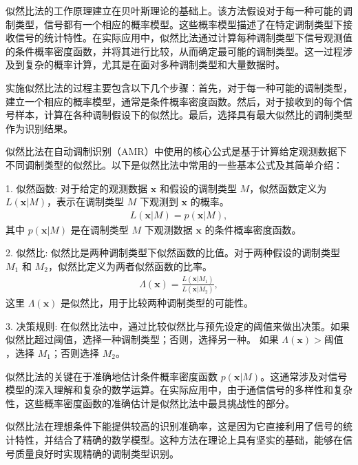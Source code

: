 似然比法的工作原理建立在贝叶斯理论的基础上。该方法假设对于每一种可能的调制类型，信号都有一个相应的概率模型。这些概率模型描述了在特定调制类型下接收信号的统计特性。在实际应用中，似然比法通过计算每种调制类型下信号观测值的条件概率密度函数，并将其进行比较，从而确定最可能的调制类型。这一过程涉及到复杂的概率计算，尤其是在面对多种调制类型和大量数据时。

实施似然比法的过程主要包含以下几个步骤：首先，对于每一种可能的调制类型，建立一个相应的概率模型，通常是条件概率密度函数。然后，对于接收到的每个信号样本，计算在各种调制假设下的似然比。最后，选择具有最大似然比的调制类型作为识别结果。

似然比法在自动调制识别（AMR）中使用的核心公式是基于计算给定观测数据下不同调制类型的似然比。以下是似然比法中常用的一些基本公式及其简单介绍：

1. 似然函数:
    对于给定的观测数据 \( \mathbf{x} \) 和假设的调制类型 \( M \)，似然函数定义为 \( L(\mathbf{x} | M) \)，表示在调制类型 \( M \) 下观测到 \( \mathbf{x} \) 的概率。
\begin{align}
    L(\mathbf{x} | M) = p(\mathbf{x} | M),
\end{align}
     其中 \( p(\mathbf{x} | M) \) 是在调制类型 \( M \) 下观测数据 \( \mathbf{x} \) 的条件概率密度函数。

2. 似然比:
   似然比是两种调制类型下似然函数的比值。对于两种假设的调制类型 \( M_1 \) 和 \( M_2 \)，似然比定义为两者似然函数的比率。
\begin{align}
    \Lambda(\mathbf{x}) = \frac{L(\mathbf{x} | M_1)}{L(\mathbf{x} | M_2)},
\end{align}
     这里 \( \Lambda(\mathbf{x}) \) 是似然比，用于比较两种调制类型的可能性。

3. 决策规则:
   在似然比法中，通过比较似然比与预先设定的阈值来做出决策。如果似然比超过阈值，选择一种调制类型；否则，选择另一种。
   如果 \( \Lambda(\mathbf{x}) > \text{阈值} \)，选择 \( M_1 \)；否则选择 \( M_2 \)。

似然比法的关键在于准确地估计条件概率密度函数 \( p(\mathbf{x} | M) \)。这通常涉及对信号模型的深入理解和复杂的数学运算。在实际应用中，由于通信信号的多样性和复杂性，这些概率密度函数的准确估计是似然比法中最具挑战性的部分。

似然比法在理想条件下能提供较高的识别准确率，这是因为它直接利用了信号的统计特性，并结合了精确的数学模型。这种方法在理论上具有坚实的基础，能够在信号质量良好时实现精确的调制类型识别。

